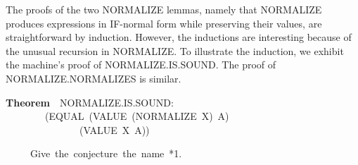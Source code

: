 \documentclass[10pt]{book}
\newenvironment{pubasis}{\begin{flushleft}}{\end{flushleft}}
\newcommand{\axiomordefinition}[1]{\vspace{6pt}\Large\textsf{\textbf{#1}}\normalsize}
\begin{document}
The proofs of the two NORMALIZE lemmas, namely that NORMALIZE produces expressions
in IF-normal form while preserving their values, are straightforward by
induction.  However, the inductions are interesting
because of the unusual recursion in NORMALIZE.  To illustrate the induction, we exhibit the
machine's proof of NORMALIZE.IS.SOUND.  The proof of NORMALIZE.NORMALIZES is similar.
\begin{pubasis}
\axiomordefinition{Theorem}~~NORMALIZE.IS.SOUND:\\
~~~~~~~~(EQUAL~(VALUE~(NORMALIZE~X)~A)\\
~~~~~~~~~~~~~~~(VALUE~X~A))\\
\end{pubasis}
\begin{pubasis}
~~~~~Give~the~conjecture~the~name~*1.\\


\end{pubasis}
\end{document}
